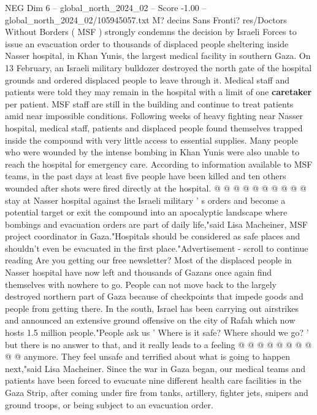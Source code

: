\begin{textsample}{NEG Dim 6 – global\_north\_2024\_02 – Score -1.00 – global\_north\_2024\_02/105945057.txt}  \label{ex:f6_neg_248}
M? decins Sans Fronti? res/Doctors Without Borders ( MSF ) strongly condemns the decision by Israeli Forces to issue an evacuation order to thousands of displaced people sheltering inside Nasser hospital, in Khan Yunis, the largest medical facility in southern Gaza.
On 13 February, an Israeli military bulldozer destroyed the north gate of the hospital grounds and ordered displaced people to leave through it.
Medical staff and patients were told they may remain in the hospital with a limit of one \textbf{caretaker} per patient.
MSF staff are still in the building and continue to treat patients amid near impossible conditions.
Following weeks of heavy fighting near Nasser hospital, medical staff, patients and displaced people found themselves trapped inside the compound with very little access to essential supplies.
Many people who were wounded by the intense bombing in Khan Yunis were also unable to reach the hospital for emergency care.
According to information available to MSF teams, in the past days at least five people have been killed and ten others wounded after shots were fired directly at the hospital. @ @ @ @ @ @ @ @ @ @ stay at Nasser hospital against the Israeli military ' s orders and become a potential target or exit the compound into an apocalyptic landscape where bombings and evacuation orders are part of daily life,"said Lisa Macheiner, MSF project coordinator in Gaza."Hospitals should be considered as safe places and shouldn't even be evacuated in the first place."Advertisement - scroll to continue reading Are you getting our free newsletter?
Most of the displaced people in Nasser hospital have now left and thousands of Gazans once again find themselves with nowhere to go.
People can not move back to the largely destroyed northern part of Gaza because of checkpoints that impede goods and people from getting there.
In the south, Israel has been carrying out airstrikes and announced an extensive ground offensive on the city of Rafah which now hosts 1.5 million people."People ask us ' Where is it safe?
Where should we go? ' but there is no answer to that, and it really leads to a feeling @ @ @ @ @ @ @ @ @ @ anymore.
They feel unsafe and terrified about what is going to happen next,"said Lisa Macheiner.
Since the war in Gaza began, our medical teams and patients have been forced to evacuate nine different health care facilities in the Gaza Strip, after coming under fire from tanks, artillery, fighter jets, snipers and ground troops, or being subject to an evacuation order.

\end{textsample}

